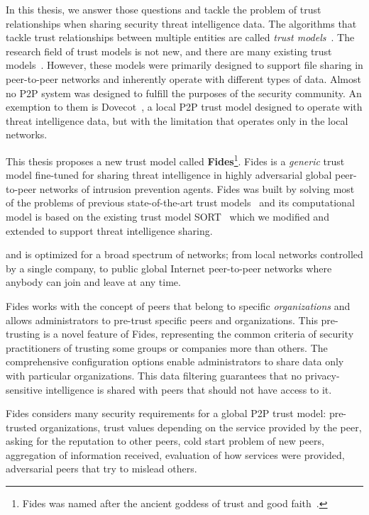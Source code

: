 In this thesis, we answer those questions and tackle the problem of trust relationships when sharing security threat intelligence data.
The algorithms that tackle trust relationships between multiple entities are called \textit{trust models}~\cite{wang2003trust}.
The research field of trust models is not new, and there are many existing trust models~\cite{abera2019sadan, sort, christensen2014hybrid, 1562680, huynh2006integrated, kamvar2003eigentrust, li2014design, pinyol2013computational, xiong2004peertrust}.
However, these models were primarily designed to support file sharing in peer-to-peer networks and inherently operate with different types of data. Almost no P2P system was designed to fulfill the purposes of the security community.
An exemption to them is Dovecot~\cite{dita}, a local P2P trust model designed to operate with threat intelligence data, but with the limitation that operates only in the local networks.

This thesis proposes a new trust model called \textbf{Fides}\footnote{Fides was named after the ancient goddess of trust and good faith~\cite{enwiki:1086924565}.}.
Fides is a \textit{generic} trust model fine-tuned for sharing threat intelligence in highly adversarial global peer-to-peer networks of intrusion prevention agents.
Fides was built by solving most of the problems of previous state-of-the-art trust models~\cite{sort, dita} and its computational model is based on the existing trust model SORT~\cite{sort} which we modified and extended to support threat intelligence sharing.

and is optimized for a broad spectrum of networks; from local networks controlled by a single company, to public global Internet peer-to-peer networks where anybody can join and leave at any time.

Fides works with the concept of peers that belong to specific \textit{organizations} and allows administrators to pre-trust specific peers and organizations. This pre-trusting is a novel feature of Fides, representing the common criteria of security practitioners of trusting some groups or companies more than others. The comprehensive configuration options enable administrators to share data only with particular organizations. This data filtering guarantees that no privacy-sensitive intelligence is shared with peers that should not have access to it.

Fides considers many security requirements for a global P2P trust model: pre-trusted organizations, trust values depending on the service provided by the peer, asking for the reputation to other peers, cold start problem of new peers, aggregation of information received, evaluation of how services were provided, adversarial peers that try to mislead others.

